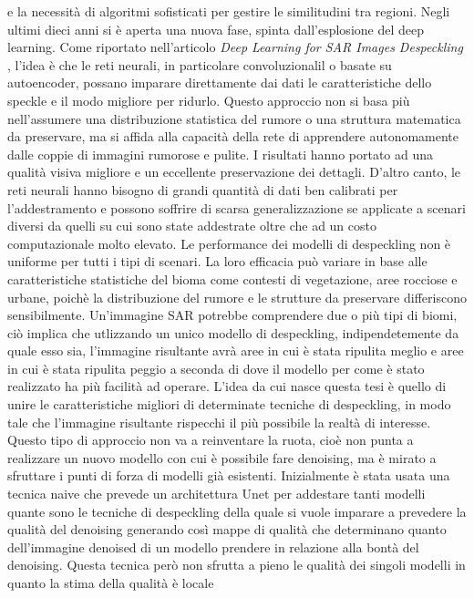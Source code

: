 e la necessità di algoritmi sofisticati per gestire le similitudini tra regioni. Negli ultimi dieci 
anni si è aperta una nuova fase, spinta dall'esplosione del deep learning. Come riportato nell'articolo 
\textit{Deep Learning for SAR Images Despeckling} \cite{DL_SAR}, l'idea è che le reti neurali, in 
particolare convoluzionalil o basate su autoencoder, possano imparare direttamente dai dati le caratteristiche
dello speckle e il modo migliore per ridurlo. Questo approccio non si basa più nell'assumere una distribuzione 
statistica del rumore o una struttura matematica da preservare, ma si affida alla capacità della rete di 
apprendere autonomamente dalle coppie di immagini rumorose e pulite. I risultati hanno portato ad una qualità 
visiva migliore e un eccellente preservazione dei dettagli. D'altro canto, le reti neurali hanno bisogno 
di grandi quantità di dati ben calibrati per l'addestramento e possono soffrire di scarsa generalizzazione se 
applicate a scenari diversi da quelli su cui sono state addestrate oltre che ad un costo computazionale molto elevato. 
Le performance dei modelli di despeckling non è uniforme per tutti i tipi di scenari. La loro efficacia può variare
in base alle caratteristiche statistiche del bioma come contesti di vegetazione, aree rocciose e urbane, 
poichè la distribuzione del rumore e le strutture da preservare differiscono sensibilmente. Un'immagine SAR potrebbe 
comprendere due o più tipi di biomi, ciò implica che utlizzando un unico modello di despeckling, 
indipendetemente da quale esso sia, l'immagine risultante avrà aree in cui è stata ripulita meglio e aree in cui è 
stata ripulita peggio a seconda di dove il modello per come è stato realizzato ha più facilità ad operare.
L'idea da cui nasce questa tesi è quello di unire le caratteristiche migliori di determinate tecniche di despeckling, 
in modo tale che l'immagine risultante rispecchi il più possibile la realtà di interesse. Questo tipo di approccio non va a 
reinventare la ruota, cioè non punta a realizzare un nuovo modello con cui è possibile fare denoising, ma è mirato
a sfruttare i punti di forza di modelli già esistenti. Inizialmente è stata usata una tecnica naive che 
prevede un architettura Unet per addestare tanti modelli quante sono le tecniche di despeckling 
della quale si vuole imparare a prevedere la qualità del denoising generando così mappe di qualità 
che determinano quanto dell'immagine denoised di un  modello prendere in relazione alla bontà del denoising.
Questa tecnica però non sfrutta a pieno le qualità dei singoli modelli in quanto la stima della qualità è locale 
